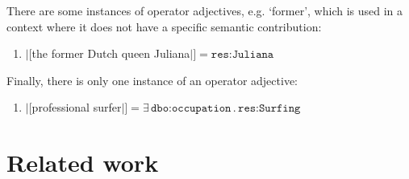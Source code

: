 \documentclass[11pt]{article}
\begin{document}
\vspace{-1.5em}
There are some instances of operator adjectives, e.g. `former', which is used in a context 
where it does not have a specific semantic contribution:
\begin{enumerate}
\item $|[$the former Dutch queen Juliana$|]=\texttt{res:Juliana}$
\end{enumerate}

Finally, there is only one instance of an operator adjective:
\begin{enumerate}
\item %
    $|[$professional surfer$|]=\exists\,\texttt{dbo:occupation}\,.\,\texttt{res:Surfing}$
\end{enumerate}





\section{Related work}
\end{document}
